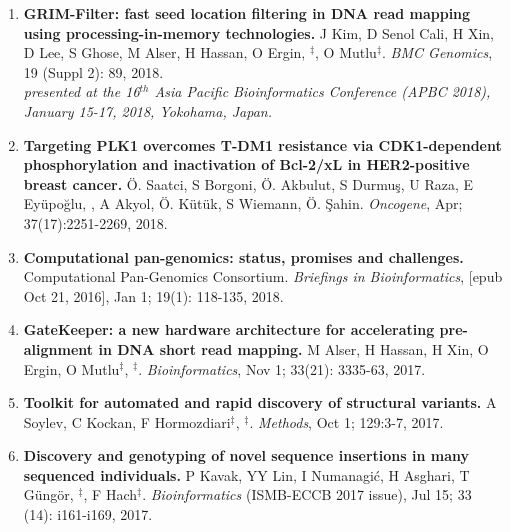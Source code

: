 \begin{enumerate}
          \item

         {\bf GRIM-Filter: fast seed location filtering in DNA read mapping using processing-in-memory technologies.}
         J Kim, D Senol Cali, H Xin, D Lee, S Ghose, M Alser, H Hassan, O Ergin, \calkan{}$^\ddag$, O Mutlu$^\ddag$.
         {\em BMC Genomics}, 19 (Suppl 2): 89, 2018.\\
         \hspace*{1cm}
          {\footnotesize \em presented at the 16$^{th}$ Asia Pacific Bioinformatics Conference (APBC 2018), January 15-17, 2018, Yokohama, Japan.}

         \item        

         {\bf Targeting PLK1 overcomes T-DM1 resistance via CDK1-dependent phosphorylation and inactivation of Bcl-2/xL in HER2-positive breast cancer.}
         Ö. Saatci, S Borgoni, Ö. Akbulut, S Durmuş, U Raza, E Eyüpoğlu, \calkan{}, A Akyol, Ö. Kütük, S Wiemann, Ö. Şahin.         
         {\em Oncogene}, Apr;  37(17):2251-2269, 2018.

         \item        

         {\bf Computational pan-genomics: status, promises and challenges.}
         Computational Pan-Genomics Consortium. {\em Briefings in Bioinformatics}, [epub Oct 21, 2016], Jan 1; 19(1): 118-135, 2018.
         
         \item
         
         {\bf GateKeeper: a new hardware architecture for accelerating pre-alignment in DNA short read mapping.}
         M Alser, H Hassan, H Xin, O Ergin, O Mutlu$^\ddag$, \calkan{}$^\ddag$.
         {\em Bioinformatics}, Nov 1;  33(21): 3335-63, 2017.

         \item
         {\bf Toolkit for automated and rapid discovery of structural variants.}
          A Soylev, C Kockan, F Hormozdiari$^\ddag$, \calkan{}$^\ddag$.
          {\em Methods}, Oct 1; 129:3-7, 2017.
                                       
\clearpage

  \item
                                     

         {\bf Discovery and genotyping of novel sequence insertions in many sequenced individuals.}
         P Kavak, YY Lin, I Numanagić, H Asghari, T Güngör, \calkan{}$^\ddag$, F Hach$^\ddag$.
         {\em Bioinformatics} (ISMB-ECCB 2017 issue), Jul 15;  33 (14): i161-i169, 2017.\\
         

\end{enumerate}
